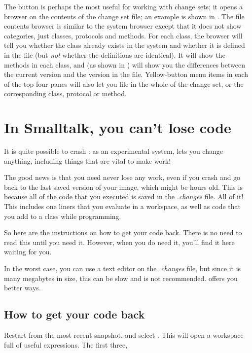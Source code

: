 \documentclass[a4paper,10pt,twoside]{book}
\begin{document}
The  button is perhaps the most useful for working with change sets; it opens a browser on the contents of the change set file; an example is shown in .
The file contents browser is similar to the system browser except that it does not show categories, just classes, protocols and methods.
For each class, the browser will tell you whether the class already exists in the system and whether it is defined in the file (but \emph{not} whether the definitions are identical).  
It will show the methods in each class, and (as shown in ) will show you the differences between the current version and the version in the file.
Yellow-button menu items in each of the top four panes will also let you file in the whole of the change set, or the corresponding class, protocol or method. 

\section{In Smalltalk, you can't lose code}
\label{sec:cantLoseCode} %

It is quite possible to crash \sq: as an experimental system, \sq lets you change anything, including things that are vital to make \sq work! 


The good news is that you need never lose any work, even if you crash and go back to the last saved version of your image, which might be hours old.
This is because all of the code that you executed is saved in the \emph{.changes} file.
All of it!
This includes one liners that you evaluate in a workspace, as well as code that you add to a class while programming.

So here are the instructions on how to get your code back.
There is no need to read this until you need it. 
However, when you do need it, you'll find it here waiting for you.

In the worst case, you can use a text editor on the \emph{.changes} file, but since it is many megabytes in size, this can be slow and is not recommended. 
\sq offers you better ways.

\subsection{How to get your code back}
Restart \sq from the most recent snapshot, and select . 
This will open a workspace full of useful expressions. The first three,
\end{document}
